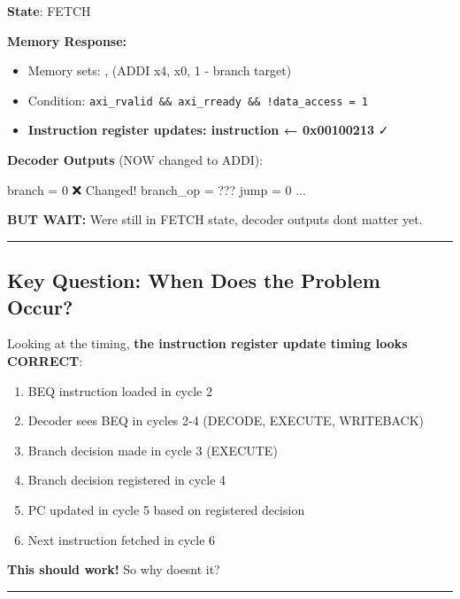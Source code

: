 \begin{record}

\textbf{State}: FETCH

\textbf{Memory Response:}

\begin{itemize}
\tightlist
\item
  Memory sets: ,  (ADDI
  x4, x0, 1 - branch target)
\item
  Condition:
  \texttt{axi\_\allowbreak{}rvalid\ \&\&\ axi\_\allowbreak{}rready\ \&\&\ !data\_\allowbreak{}access\ =\allowbreak{}\ 1}
\item
  \textbf{Instruction register updates: instruction ← 0x00100213} ✓
\end{itemize}

\textbf{Decoder Outputs} (NOW changed to ADDI):

\begin{textblock}
branch    = 0  ❌ Changed!
branch_op = ???
jump      = 0
...
\end{textblock}

\textbf{BUT WAIT:} We\textquotesingle re still in FETCH state, decoder
outputs don\textquotesingle t matter yet.

\begin{center}\rule{0.5\linewidth}{0.5pt}\end{center}

\end{record}

\subsection{Key Question: When Does the Problem Occur?}\label{cr:fix:timing-analysis:key-question-when-does-the-problem-occur}

\begin{record}

Looking at the timing, \textbf{the instruction register update timing
looks CORRECT}:

\begin{enumerate}
\def\labelenumi{\arabic{enumi}.}
\tightlist
\item
  BEQ instruction loaded in cycle 2
\item
  Decoder sees BEQ in cycles 2-4 (DECODE, EXECUTE, WRITEBACK)
\item
  Branch decision made in cycle 3 (EXECUTE)
\item
  Branch decision registered in cycle 4
\item
  PC updated in cycle 5 based on registered decision
\item
  Next instruction fetched in cycle 6
\end{enumerate}

\textbf{This should work!} So why doesn\textquotesingle t it?

\begin{center}\rule{0.5\linewidth}{0.5pt}\end{center}

\end{record}

